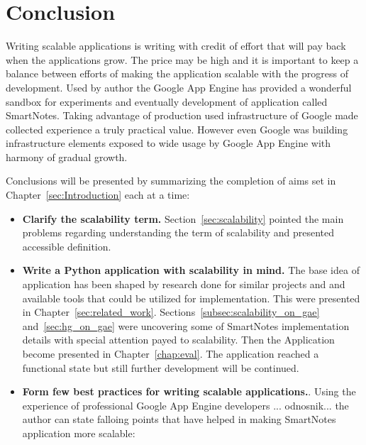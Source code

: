 \chapter{Conclusion}
Writing scalable applications is writing with credit of effort that will pay back when the applications grow. The price may be high and it is important to keep a balance between efforts of making the application scalable with the progress of development. Used by author  the Google App Engine has provided a wonderful sandbox for experiments and eventually development of application called SmartNotes. Taking advantage of production used infrastructure of Google made collected experience a truly practical value. However even Google was building infrastructure elements exposed to wide usage by Google App Engine  with harmony of gradual growth.

Conclusions will be presented by summarizing the completion of aims set in Chapter~\ref{sec:Introduction} each at a time:
\begin{itemize}
\item{\textbf{Clarify the scalability term.} Section~\ref{sec:scalability} pointed the main problems regarding understanding the term of scalability and presented accessible definition.}
\item{\textbf{Write a Python application with scalability in mind.} The base idea of application has been shaped by research done for similar projects and and available tools that could be utilized for implementation. This were presented in Chapter~\ref{sec:related_work}. Sections~\ref{subsec:scalability_on_gae} and~\ref{sec:hg_on_gae} were uncovering some of SmartNotes implementation details with special attention payed to scalability. Then the Application become presented in Chapter~\ref{chap:eval}. The application reached a functional state but still further development will be continued.}
\item{\textbf{Form few best practices for writing scalable applications.}. Using the experience of professional Google App Engine developers ... odnosnik... the author can state falloing points that have helped in making SmartNotes application more scalable:  }
\end{itemize} 